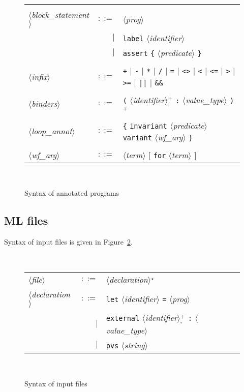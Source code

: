 \documentclass[a4paper,12pt]{report}
\newcommand{\te}[1]{\texttt{#1}}
\newcommand{\nt}[1]{$\langle$\textsl{#1}$\rangle$}
\newcommand{\etoile}{$^{\star}$}
\newcommand{\plus}{$^+$}
\newcommand{\plussep}[1]{$^+_#1$}
\begin{document}
\begin{figure}[htbp]
\begin{center}
\begin{tabular}{lrl}
      & & \\[0.1em]

  \nt{block\_statement}
    & $::=$ & \nt{prog} \\
      & $|$ & \te{label} \nt{identifier} \\
      & $|$ & \te{assert} \te{\{} \nt{predicate} \te{\}} \\

      & & \\[0.1em]
 
  \nt{infix}
    & $::=$ & \te{+} $|$ \te{-} $|$ \te{*} $|$ \te{/} $|$ 
              \te{=} $|$ \te{<>} $|$ 
              \te{<} $|$ \te{<=} $|$ \te{>} $|$ \te{>=} $|$
              \te{||} $|$ \te{\&\&} \\
      & & \\[0.1em]

  \nt{binders}
    & $::=$ & \te{(} \nt{identifier}\plussep{\te{,}} \te{:}
              \nt{value\_type} \te{)}\plus \\
  \\[0.1em]

  \nt{loop\_annot}
    & $::=$ & \te{\{} \te{invariant} \nt{predicate} 
              \te{variant} \nt{wf\_arg} \te{\}} \\
      & & \\[0.1em]

  \nt{wf\_arg} 
    & $::=$ & \nt{term} $[$ \te{for} \nt{term} $]$ \\

\end{tabular}\\
\hrulefill
\caption{Syntax of annotated programs}
\label{fig:caml}
\end{center}
\end{figure}

\subsection{ML files}

Syntax of input files is given in Figure~\ref{fig:input}.

\begin{figure}[htbp]
\begin{center}
\hrulefill\\
\begin{tabular}{lrl}
  \nt{file}
    & $::=$ & \nt{declaration}\etoile\
  \\[0.1em]

  \nt{declaration}
    & $::=$ & \te{let} \nt{identifier} \te{=} \nt{prog} \\
      & $|$ & \te{external} \nt{identifier}\plussep{\te{,}}
              \te{:} \nt{value\_type} \\
      & $|$ & \te{pvs} \nt{string}
\end{tabular}\\
\hrulefill
\caption{Syntax of input files}
\label{fig:input}
\end{center}           
\end{figure}
\end{document}
